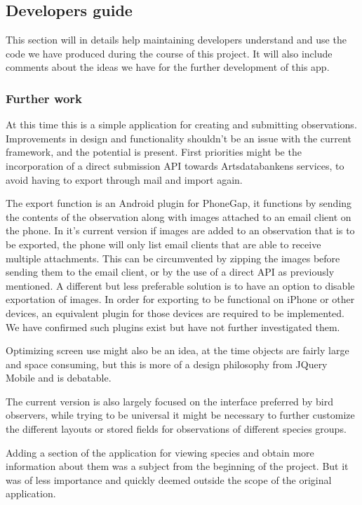 \subsection{Developers guide}

This section will in details help maintaining developers understand and use the
code we have produced during the course of this project. It will also include
comments about the ideas we have for the further development of this app.

\subsubsection{Further work}
At this time this is a simple application for creating and submitting
observations. Improvements in design and functionality shouldn't be an issue with the current framework,
and the potential is present. First priorities might be the incorporation of a
direct submission API towards Artsdatabankens services, to avoid having to
export through mail and import again. 

The export function is an Android plugin for PhoneGap, it functions by sending the contents 
of the observation along with images attached to an email client on the phone. 
In it's current version if images are added to an observation that is to be 
exported, the phone will only list email clients that are able to receive multiple attachments.
This can be circumvented by zipping the images before sending them to the email client, or by the use
of a direct API as previously mentioned. A different but less preferable solution is to have an option
to disable exportation of images.
In order for exporting to be functional on iPhone or other devices, an equivalent
plugin for those devices are required to be implemented. We have confirmed such plugins exist but have
not further investigated them.

Optimizing screen use might also be an
idea, at the time objects are fairly large and space consuming, but this is
more of a design philosophy from JQuery Mobile and is debatable.

The current version is also largely focused on the interface preferred by bird observers, 
while trying to be universal it might be necessary to further customize the different 
layouts or stored fields for observations of different species groups.

Adding a section of the application for viewing species and obtain more
information about them was a subject from the beginning of the project.  But it
was of less importance and quickly deemed outside the scope of the original
application.

